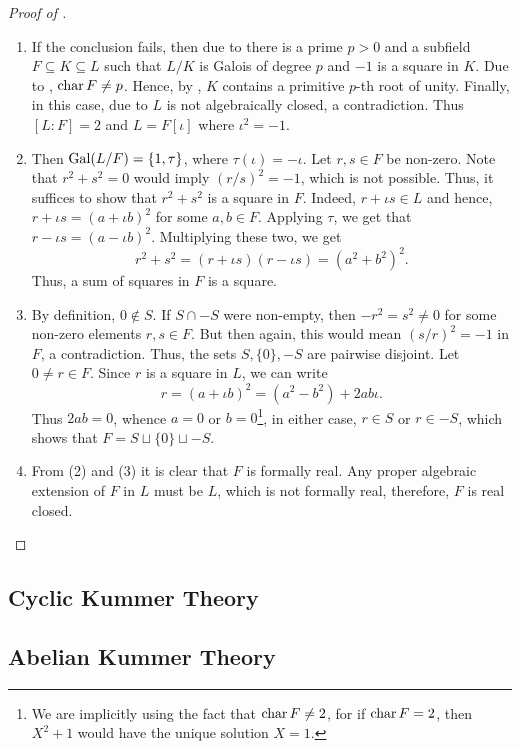\begin{proof}[Proof of ]
\begin{enumerate}[label=(\arabic*)]
    \item If the conclusion fails, then due to  there is a prime $p > 0$ and a subfield $F\subseteq K\subseteq L$ such that $L/K$ is Galois of degree $p$ and $-1$ is a square in $K$. Due to , $\operatorname{char} F\ne p$. Hence, by , $K$ contains a primitive $p$-th root of unity. Finally, in this case, due to  $L$ is not algebraically closed, a contradiction. Thus $[L : F] = 2$ and $L = F[\iota]$ where $\iota^2 = -1$.
    \item Then $\operatorname{Gal}(L/F) = \{1,\tau\}$, where $\tau(\iota) = -\iota$. Let $r,s\in F$ be non-zero. Note that $r^2 + s^2 = 0$ would imply $(r/s)^2 = -1$, which is not possible. Thus, it suffices to show that $r^2 + s^2$ is a square in $F$. Indeed, $r + \iota s\in L$ and hence, $r + \iota s = (a + \iota b)^2$ for some $a,b\in F$. Applying $\tau$, we get that $r - \iota s = (a - \iota b)^2$. Multiplying these two, we get 
    \begin{equation*}
        r^2 + s^2 = (r + \iota s)(r - \iota s) = (a^2 + b^2)^2.
    \end{equation*}
    Thus, a sum of squares in $F$ is a square. 
    \item By definition, $0\notin S$. If $S\cap -S$ were non-empty, then $-r^2 = s^2\ne 0$ for some non-zero elements $r,s\in F$. But then again, this would mean $(s/r)^2 = -1$ in $F$, a contradiction. Thus, the sets $S, \{0\}, -S$ are pairwise disjoint. Let $0\ne r\in F$. Since $r$ is a square in $L$, we can write 
    \begin{equation*}
        r = (a +\iota b)^2 = (a^2 - b^2) + 2ab\iota.
    \end{equation*}
    Thus $2ab = 0$, whence $a = 0$ or $b = 0$\footnote{We are implicitly using the fact that $\operatorname{char} F\ne 2$, for if $\operatorname{char} F = 2$, then $X^2 + 1$ would have the unique solution $X = 1$.}, in either case, $r\in S$ or $r\in -S$, which shows that $F = S\sqcup\{0\}\sqcup -S$.
    \item From (2) and (3) it is clear that $F$ is formally real. Any proper algebraic extension of $F$ in $L$ must be $L$, which is not formally real, therefore, $F$ is real closed.\qedhere
\end{enumerate}
\end{proof}

\subsection{Cyclic Kummer Theory}
\subsection{Abelian Kummer Theory}